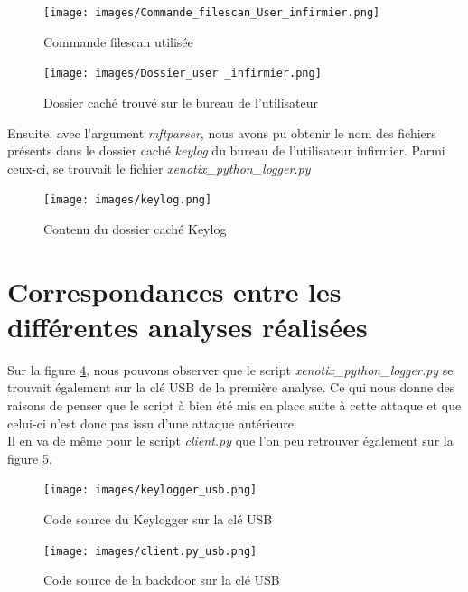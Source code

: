 \documentclass[a4paper]{article}
\begin{document}
\begin{figure}[H]
    \centering
    \texttt{[image: images/Commande\_filescan\_User\_infirmier.png]}
    \caption{Commande filescan utilisée}
    \label{fig:filescan_command}
\end{figure}

\begin{figure}[H]
    \centering
    \texttt{[image: images/Dossier\_user \_infirmier.png]}
    \caption{Dossier caché trouvé sur le bureau de l'utilisateur}
    \label{fig:dossier_user_infirmier}
\end{figure}

Ensuite, avec l'argument \textit{mftparser}, nous avons pu obtenir le nom des fichiers présents dans le dossier caché \textit{keylog} du bureau de l'utilisateur infirmier.
Parmi ceux-ci, se trouvait le fichier \textit{xenotix\_python\_logger.py}

\begin{figure}[H]
    \centering
    \texttt{[image: images/keylog.png]}
    \caption{Contenu du dossier caché Keylog}
    \label{fig:contenu_keylog}
\end{figure}














\newpage
\section{Correspondances entre les différentes analyses réalisées}

Sur la figure \ref{fig:keylogger_usb}, nous pouvons observer que le script \emph{xenotix\_python\_logger.py} se trouvait également sur la clé USB de la première analyse. Ce qui nous donne des raisons de penser que le script à bien été mis en place suite à cette attaque et que celui-ci n'est donc pas issu d'une attaque antérieure.\\
Il en va de même pour le script \emph{client.py} que l'on peu retrouver également sur la figure \ref{fig:client_usb}.

\begin{figure}[H]
    \centering
    \texttt{[image: images/keylogger\_usb.png]}
    \caption{Code source du Keylogger sur la clé USB}
    \label{fig:keylogger_usb}
\end{figure}

\begin{figure}[H]
    \centering
    \texttt{[image: images/client.py\_usb.png]}
    \caption{Code source de la backdoor sur la clé USB}
    \label{fig:client_usb}
\end{figure}
\end{document}

